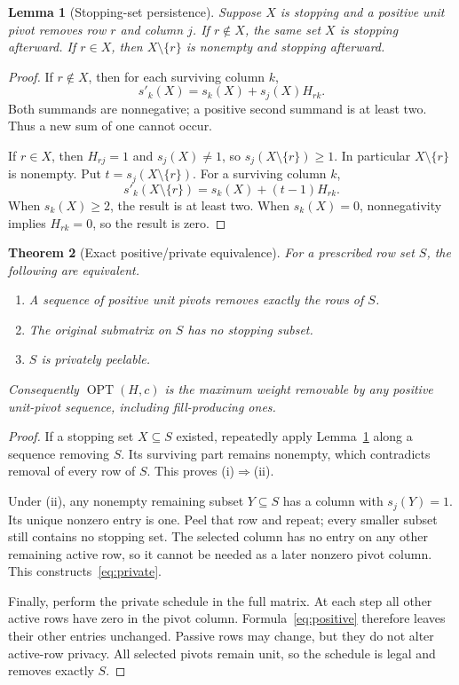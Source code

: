 \documentclass[11pt,a4paper]{article}
\newtheorem{theorem}{Theorem}[section]
\newtheorem{lemma}[theorem]{Lemma}
\theoremstyle{definition}
\theoremstyle{remark}
\newcommand{\OPT}{\operatorname{OPT}}
\begin{document}
\begin{lemma}[Stopping-set persistence]
\label{lem:persistence}
Suppose $X$ is stopping and a positive unit pivot removes row $r$ and
column $j$. If $r\notin X$, the same set $X$ is stopping afterward. If
$r\in X$, then $X\setminus\{r\}$ is nonempty and stopping afterward.
\end{lemma}
\begin{proof}
If $r\notin X$, then for each surviving column $k$,
\[
 s'_k(X)=s_k(X)+s_j(X)H_{rk}.
\]
Both summands are nonnegative; a positive second summand is at least two.
Thus a new sum of one cannot occur.

If $r\in X$, then $H_{rj}=1$ and $s_j(X)\ne1$, so
$s_j(X\setminus\{r\})\geq1$. In particular $X\setminus\{r\}$ is
nonempty. Put $t=s_j(X\setminus\{r\})$. For a surviving column $k$,
\[
 s'_k(X\setminus\{r\})
 =s_k(X)+(t-1)H_{rk}.
\]
When $s_k(X)\geq2$, the result is at least two. When $s_k(X)=0$,
nonnegativity implies $H_{rk}=0$, so the result is zero.
\end{proof}

\begin{theorem}[Exact positive/private equivalence]
\label{thm:positive-private}
For a prescribed row set $S$, the following are equivalent.
\begin{enumerate}[label=(\roman*)]
\item A sequence of positive unit pivots removes exactly the rows of $S$.
\item The original submatrix on $S$ has no stopping subset.
\item $S$ is privately peelable.
\end{enumerate}
Consequently $\OPT(H,c)$ is the maximum weight removable by
\emph{any} positive unit-pivot sequence, including fill-producing ones.
\end{theorem}
\begin{proof}
If a stopping set $X\subseteq S$ existed, repeatedly apply
Lemma~\ref{lem:persistence} along a sequence removing $S$. Its surviving
part remains nonempty, which contradicts removal of every row of $S$.
This proves (i)$\Rightarrow$(ii).

Under (ii), any nonempty remaining subset $Y\subseteq S$ has a column
with $s_j(Y)=1$. Its unique nonzero entry is one. Peel that row and repeat;
every smaller subset still contains no stopping set. The selected column
has no entry on any other remaining active row, so it cannot be needed as
a later nonzero pivot column. This constructs~\eqref{eq:private}.

Finally, perform the private schedule in the full matrix. At each step
all other active rows have zero in the pivot column. Formula~\eqref{eq:positive}
therefore leaves their other entries unchanged. Passive rows may change,
but they do not alter active-row privacy. All selected pivots remain unit,
so the schedule is legal and removes exactly $S$.
\end{proof}
\end{document}
